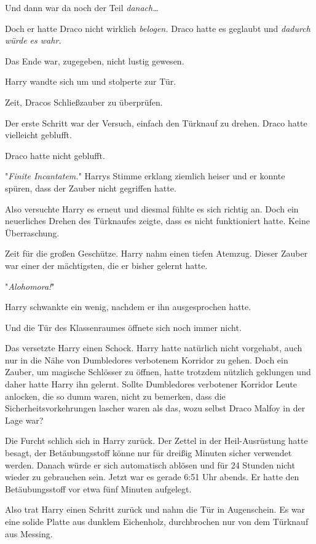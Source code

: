 {Und dann war da noch der Teil \emph{danach…}

Doch er hatte Draco nicht wirklich \emph{belogen.} Draco hatte es geglaubt und \emph{dadurch würde es wahr.}

Das Ende war, zugegeben, nicht lustig gewesen.

Harry wandte sich um und stolperte zur Tür.

Zeit, Dracos Schließzauber zu überprüfen.

Der erste Schritt war der Versuch, einfach den Türknauf zu drehen. Draco hatte vielleicht geblufft.

Draco hatte nicht geblufft.

"\emph{Finite Incantatem.}" Harrys Stimme erklang ziemlich heiser und er konnte spüren, dass der Zauber nicht gegriffen hatte.

Also versuchte Harry es erneut und diesmal fühlte es sich richtig an. Doch ein neuerliches Drehen des Türknaufes zeigte, dass es nicht funktioniert hatte. Keine Überraschung.

Zeit für die großen Geschütze. Harry nahm einen tiefen Atemzug. Dieser Zauber war einer der mächtigsten, die er bisher gelernt hatte.

"\emph{Alohomora!}"

Harry schwankte ein wenig, nachdem er ihn ausgesprochen hatte.

Und die Tür des Klassenraumes öffnete sich noch immer nicht.

Das versetzte Harry einen Schock. Harry hatte natürlich nicht vorgehabt, auch nur in die Nähe von Dumbledores verbotenem Korridor zu gehen. Doch ein Zauber, um magische Schlösser zu öffnen, hatte trotzdem nützlich geklungen und daher hatte Harry ihn gelernt. Sollte Dumbledores verbotener Korridor Leute anlocken, die so dumm waren, nicht zu bemerken, dass die Sicherheitsvorkehrungen lascher waren als das, wozu selbst Draco Malfoy in der Lage war?

Die Furcht schlich sich in Harry zurück. Der Zettel in der Heil-Ausrüstung hatte besagt, der Betäubungsstoff könne nur für dreißig Minuten sicher verwendet werden. Danach würde er sich automatisch ablösen und für 24 Stunden nicht wieder zu gebrauchen sein. Jetzt war es gerade 6:51 Uhr abends. Er hatte den Betäubungsstoff vor etwa fünf Minuten aufgelegt.

Also trat Harry einen Schritt zurück und nahm die Tür in Augenschein. Es war eine solide Platte aus dunklem Eichenholz, durchbrochen nur von dem Türknauf aus Messing.

}

